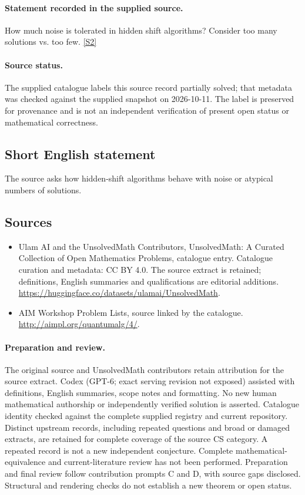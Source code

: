 \documentclass[11pt]{article}
\begin{document}
\paragraph{Statement recorded in the supplied source.}
How much noise is tolerated in hidden shift algorithms? Consider too many solutions vs. too few. \href{http://aimpl.org/quantumalg/4/}{[S2]}
\paragraph{Source status.}
The supplied catalogue labels this source record partially solved; that metadata was checked against the supplied snapshot on 2026-10-11. The label is preserved for provenance and is not an independent verification of present open status or mathematical correctness.
\subsection{Short English statement}
The source asks how hidden-shift algorithms behave with noise or atypical numbers of solutions.
\subsection{Sources}
\begin{itemize}
\item[S1] Ulam AI and the UnsolvedMath Contributors, UnsolvedMath: A Curated Collection of Open Mathematics Problems, catalogue entry. Catalogue curation and metadata: CC BY 4.0. The source extract is retained; definitions, English summaries and qualifications are editorial additions.
\url{https://huggingface.co/datasets/ulamai/UnsolvedMath}.
\item[S2] AIM Workshop Problem Lists, source linked by the catalogue.
\url{http://aimpl.org/quantumalg/4/}.
\end{itemize}
\paragraph{Preparation and review.}
The original source and UnsolvedMath contributors retain attribution for the source extract. Codex (GPT-6; exact serving revision not exposed) assisted with definitions, English summaries, scope notes and formatting. No new human mathematical authorship or independently verified solution is asserted. Catalogue identity checked against the complete supplied registry and current repository. Distinct upstream records, including repeated questions and broad or damaged extracts, are retained for complete coverage of the source CS category. A repeated record is not a new independent conjecture. Complete mathematical-equivalence and current-literature review has not been performed. Preparation and final review follow contribution prompts C and D, with source gaps disclosed. Structural and rendering checks do not establish a new theorem or open status.
\label{end:statement}
\end{document}

